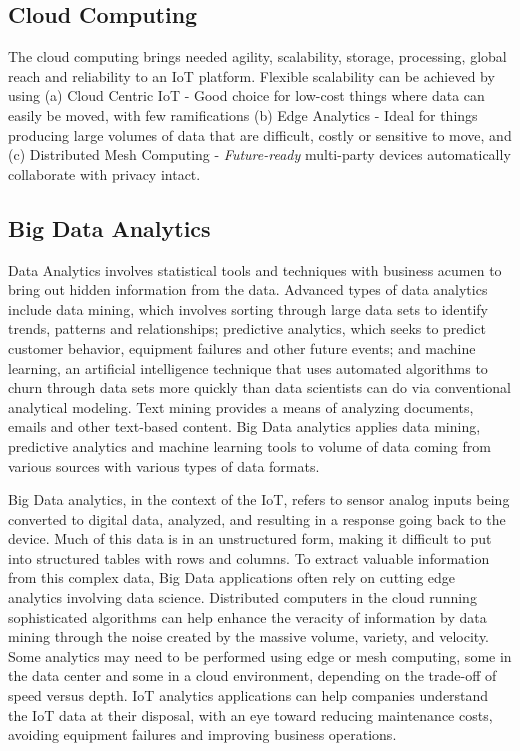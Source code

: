 \documentclass[sigconf]{acmart}
\begin{document}
\subsection{Cloud Computing}
The cloud computing brings needed agility, scalability, storage, processing, global reach and reliability to an IoT platform. Flexible scalability can be achieved by using (a) Cloud Centric IoT - Good choice for low-cost things where data can easily be moved, with few ramifications (b) Edge Analytics - Ideal for things producing large volumes of data that are difficult, costly or sensitive to move, and (c) Distributed Mesh Computing - {\em Future-ready} multi-party devices automatically collaborate with privacy intact. 

\subsection{Big Data Analytics}
Data Analytics involves statistical tools and techniques with business acumen to bring out hidden information from the data. Advanced types of data analytics include data mining, which involves sorting through large data sets to identify trends, patterns and relationships; predictive analytics, which seeks to predict customer behavior, equipment failures and other future events; and machine learning, an artificial intelligence technique that uses automated algorithms to churn through data sets more quickly than data scientists can do via conventional analytical modeling. Text mining provides a means of analyzing documents, emails and other text-based content. Big Data analytics applies data mining, predictive analytics and machine learning tools to volume of data coming from various sources with various types of data formats. 

Big Data analytics, in the context of the IoT, refers to sensor analog inputs being converted to digital data, analyzed, and resulting in a response going back to the device. Much of this data is in an unstructured form, making it difficult to put into structured tables with rows and columns. To extract valuable information from this complex data, Big Data applications often rely on cutting edge analytics involving data science. Distributed computers in the cloud running sophisticated algorithms can help enhance the veracity of information by data mining through the noise created by the massive volume, variety, and velocity. Some analytics may need to be performed using edge or mesh computing, some in the data center and some in a cloud environment, depending on the trade-off of speed versus depth. IoT analytics applications can help companies understand the IoT data at their disposal, with an eye toward reducing maintenance costs, avoiding equipment failures and improving business operations. 
\end{document}
